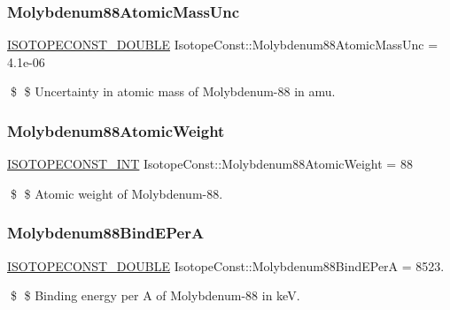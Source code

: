 \subsubsection{\texorpdfstring{Molybdenum88\+Atomic\+Mass\+Unc}{Molybdenum88AtomicMassUnc}}
{\footnotesize\ttfamily \mbox{\hyperlink{group___isotope_const-_macros_ga8f45a7272ce02c0b4c65c44636ed719a}{I\+S\+O\+T\+O\+P\+E\+C\+O\+N\+S\+T\+\_\+\+D\+O\+U\+B\+LE}} Isotope\+Const\+::\+Molybdenum88\+Atomic\+Mass\+Unc = 4.\+1e-\/06}

\$ \$ Uncertainty in atomic mass of Molybdenum-\/88 in amu. \mbox{\label{group___isotope_const-_molybdenum-_mo88_ga85caa5f1b48fb4f90f1caf806d083e82}} 
\subsubsection{\texorpdfstring{Molybdenum88\+Atomic\+Weight}{Molybdenum88AtomicWeight}}
{\footnotesize\ttfamily \mbox{\hyperlink{group___isotope_const-_macros_ga5f18360b3e99483a35c32d789e62621c}{I\+S\+O\+T\+O\+P\+E\+C\+O\+N\+S\+T\+\_\+\+I\+NT}} Isotope\+Const\+::\+Molybdenum88\+Atomic\+Weight = 88}

\$ \$ Atomic weight of Molybdenum-\/88. \mbox{\label{group___isotope_const-_molybdenum-_mo88_ga8d099a865721214891f3ed5abb41bf88}} 
\subsubsection{\texorpdfstring{Molybdenum88\+Bind\+E\+PerA}{Molybdenum88BindEPerA}}
{\footnotesize\ttfamily \mbox{\hyperlink{group___isotope_const-_macros_ga8f45a7272ce02c0b4c65c44636ed719a}{I\+S\+O\+T\+O\+P\+E\+C\+O\+N\+S\+T\+\_\+\+D\+O\+U\+B\+LE}} Isotope\+Const\+::\+Molybdenum88\+Bind\+E\+PerA = 8523.}

\$ \$ Binding energy per A of Molybdenum-\/88 in keV. \mbox{\label{group___isotope_const-_molybdenum-_mo88_ga97657a59844190ab0450a17945cfdcf8}} 
